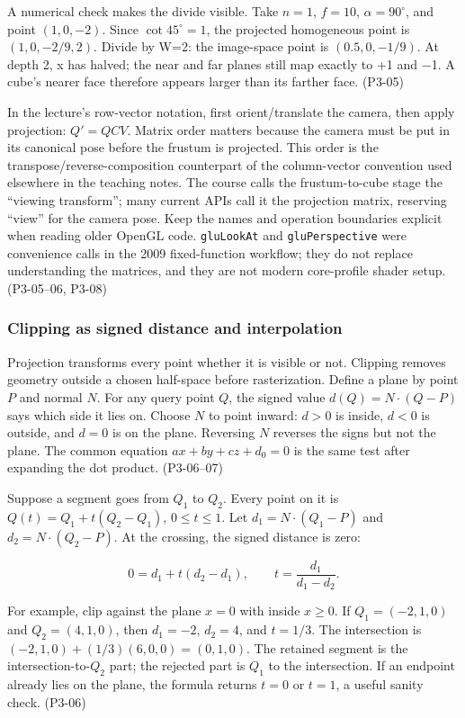 A numerical check makes the divide visible. Take \(n=1\), \(f=10\), \(\alpha=90^\circ\), and point \((1,0,-2)\). Since \(\cot45^\circ=1\), the projected homogeneous point is \((1,0,-2/9,2)\). Divide by W=2: the image-space point is \((0.5,0,-1/9)\). At depth 2, x has halved; the near and far planes still map exactly to +1 and −1. A cube's nearer face therefore appears larger than its farther face. (P3-05)

In the lecture's row-vector notation, first orient/translate the camera, then apply projection: \(Q'=QCV\). Matrix order matters because the camera must be put in its canonical pose before the frustum is projected. This order is the transpose/reverse-composition counterpart of the column-vector convention used elsewhere in the teaching notes. The course calls the frustum-to-cube stage the ``viewing transform''; many current APIs call it the projection matrix, reserving ``view'' for the camera pose. Keep the names and operation boundaries explicit when reading older OpenGL code. \texttt{gluLookAt} and \texttt{gluPerspective} were convenience calls in the 2009 fixed-function workflow; they do not replace understanding the matrices, and they are not modern core-profile shader setup. (P3-05--06, P3-08)

\subsubsection{Clipping as signed distance and interpolation}\label{03-visual-computing-i-ch003-clipping-as-signed-distance-and-interpolation}

Projection transforms every point whether it is visible or not. Clipping removes geometry outside a chosen half-space before rasterization. Define a plane by point \(P\) and normal \(N\). For any query point \(Q\), the signed value \(d(Q)=N\cdot(Q-P)\) says which side it lies on. Choose \(N\) to point inward: \(d>0\) is inside, \(d<0\) is outside, and \(d=0\) is on the plane. Reversing \(N\) reverses the signs but not the plane. The common equation \(ax+by+cz+d_0=0\) is the same test after expanding the dot product. (P3-06--07)

Suppose a segment goes from \(Q_1\) to \(Q_2\). Every point on it is \(Q(t)=Q_1+t(Q_2-Q_1)\), \(0\le t\le1\). Let \(d_1=N\cdot(Q_1-P)\) and \(d_2=N\cdot(Q_2-P)\). At the crossing, the signed distance is zero:

\[
0=d_1+t(d_2-d_1),\qquad t=\frac{d_1}{d_1-d_2}.
\]

For example, clip against the plane \(x=0\) with inside \(x\ge0\). If \(Q_1=(-2,1,0)\) and \(Q_2=(4,1,0)\), then \(d_1=-2\), \(d_2=4\), and \(t=1/3\). The intersection is \((-2,1,0)+(1/3)(6,0,0)=(0,1,0)\). The retained segment is the intersection-to-\(Q_2\) part; the rejected part is \(Q_1\) to the intersection. If an endpoint already lies on the plane, the formula returns \(t=0\) or \(t=1\), a useful sanity check. (P3-06)

